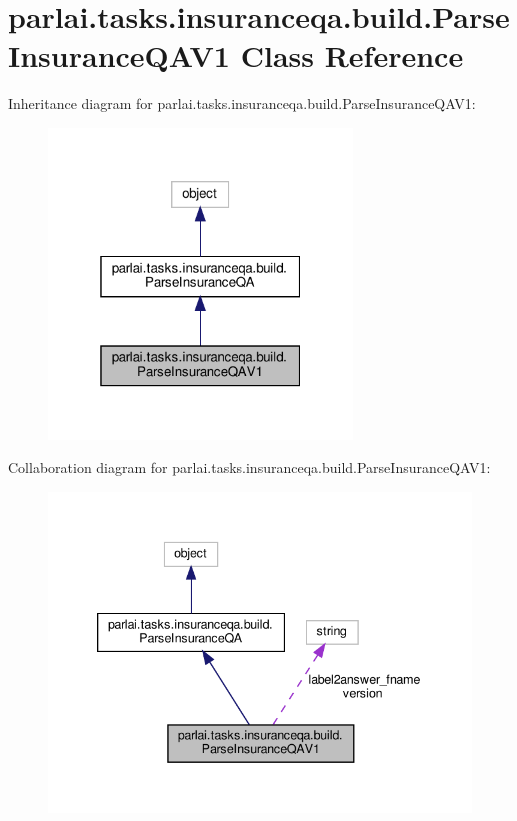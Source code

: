 \hypertarget{classparlai_1_1tasks_1_1insuranceqa_1_1build_1_1ParseInsuranceQAV1}{}\section{parlai.\+tasks.\+insuranceqa.\+build.\+Parse\+Insurance\+Q\+A\+V1 Class Reference}
\label{classparlai_1_1tasks_1_1insuranceqa_1_1build_1_1ParseInsuranceQAV1}


Inheritance diagram for parlai.\+tasks.\+insuranceqa.\+build.\+Parse\+Insurance\+Q\+A\+V1\+:
\nopagebreak
\begin{figure}[H]
\begin{center}
\leavevmode
\includegraphics[width=229pt]{classparlai_1_1tasks_1_1insuranceqa_1_1build_1_1ParseInsuranceQAV1__inherit__graph}
\end{center}
\end{figure}


Collaboration diagram for parlai.\+tasks.\+insuranceqa.\+build.\+Parse\+Insurance\+Q\+A\+V1\+:
\nopagebreak
\begin{figure}[H]
\begin{center}
\leavevmode
\includegraphics[width=339pt]{classparlai_1_1tasks_1_1insuranceqa_1_1build_1_1ParseInsuranceQAV1__coll__graph}
\end{center}
\end{figure}
